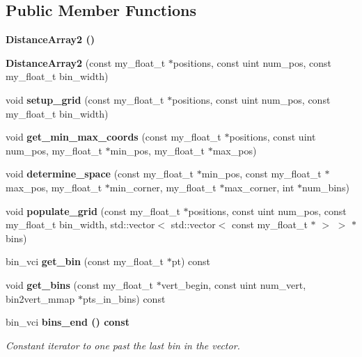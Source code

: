 \subsection*{Public Member Functions}
\begin{CompactItemize}
\item 
\bf{Distance\-Array2} ()
\item 
\textbf{Distance\-Array2} (const my\_\-float\_\-t $\ast$positions, const uint num\_\-pos, const my\_\-float\_\-t bin\_\-width)\label{classASCbase_1_1geometry_1_1DistanceArray2_49275693a93f9cebda96761d3a2915b5}

\item 
void \textbf{setup\_\-grid} (const my\_\-float\_\-t $\ast$positions, const uint num\_\-pos, const my\_\-float\_\-t bin\_\-width)\label{classASCbase_1_1geometry_1_1DistanceArray2_23d27799b8d0236ec7c24c9997922a99}

\item 
void \textbf{get\_\-min\_\-max\_\-coords} (const my\_\-float\_\-t $\ast$positions, const uint num\_\-pos, my\_\-float\_\-t $\ast$min\_\-pos, my\_\-float\_\-t $\ast$max\_\-pos)\label{classASCbase_1_1geometry_1_1DistanceArray2_9bc747ee3e49df4d6ffebb44894e7fc2}

\item 
void \textbf{determine\_\-space} (const my\_\-float\_\-t $\ast$min\_\-pos, const my\_\-float\_\-t $\ast$max\_\-pos, my\_\-float\_\-t $\ast$min\_\-corner, my\_\-float\_\-t $\ast$max\_\-corner, int $\ast$num\_\-bins)\label{classASCbase_1_1geometry_1_1DistanceArray2_d44944a03efc076969d8ab6b9973606c}

\item 
void \textbf{populate\_\-grid} (const my\_\-float\_\-t $\ast$positions, const uint num\_\-pos, const my\_\-float\_\-t bin\_\-width, std::vector$<$ std::vector$<$ const my\_\-float\_\-t $\ast$ $>$ $>$ $\ast$bins)\label{classASCbase_1_1geometry_1_1DistanceArray2_c518041203193931e8be215e65d2b5a1}

\item 
bin\_\-vci \textbf{get\_\-bin} (const my\_\-float\_\-t $\ast$pt) const \label{classASCbase_1_1geometry_1_1DistanceArray2_fe1645f8f07c30ac363eb665e0c3c365}

\item 
void \textbf{get\_\-bins} (const my\_\-float\_\-t $\ast$vert\_\-begin, const uint num\_\-vert, bin2vert\_\-mmap $\ast$pts\_\-in\_\-bins) const \label{classASCbase_1_1geometry_1_1DistanceArray2_dd5739ac76526d894efa53e17461a20b}

\item 
bin\_\-vci \bf{bins\_\-end} () const \label{classASCbase_1_1geometry_1_1DistanceArray2_cf50a867e282cb26de29625843288be7}

\begin{CompactList}\small\item\em Constant iterator to one past the last bin in the vector. \item\end{CompactList}\end{CompactItemize}
